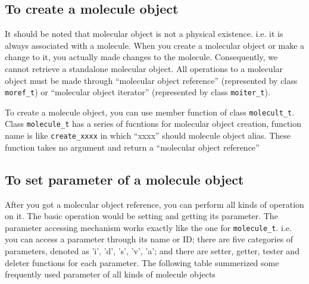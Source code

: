 \documentclass[letterpaper]{book}
\begin{document}
\subsection{To create a molecule object}
  It should be noted that molecular object is not a physical existence. i.e. it is always associated 
with a molecule. When you create a molecular object or make a change to it, you actually made changes
to the molecule. Consequently, we cannot retrieve a standalone molecular object. All operations to a
molecular object must be made through ``molecular object reference'' (represented by class 
\lstinline$moref_t$) or ``molecular object iterator'' (represented by class \lstinline$moiter_t$).


  To create a molecule object, you can use member function of class \lstinline$molecult_t$. Class 
\lstinline$molecule_t$ has a series of fucntions for molecular object creation, function name is like
\lstinline$create_xxxx$ in which ``xxxx'' should molecule object alias. These function takes no argument
and return a ``molecular object reference'' 

\subsection{To set parameter of a molecule object}

  After you got a molecular object reference, you can perform all kinds of operation on it. The basic
operation would be setting and getting its parameter. The parameter accessing mechanism works exactly like the one
for \lstinline$molecule_t$. i.e. you can access a parameter through its name or ID; there are five categories
of parameters, denoted as 'i', 'd', 's', 'v', 'a'; and there are setter, getter, tester and deleter
functions for each parameter. The following table summerized some frequently used parameter of all kinds of
molecule objects
\end{document}

